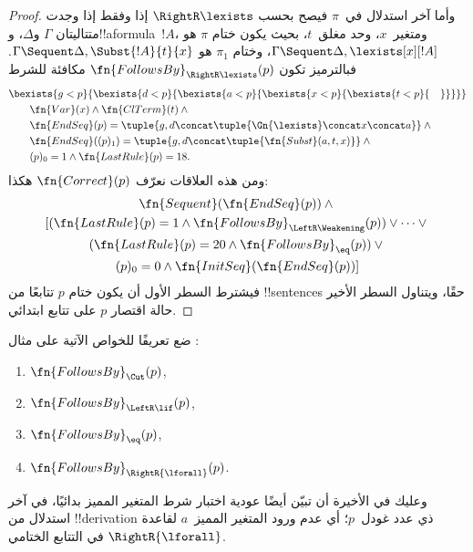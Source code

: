\documentclass[../../../include/open-logic-section]{subfiles}
\begin{document}
\begin{proof}
وأما آخر استدلال في~$\pi$ فيصح بحسب
$\RightR\lexists$ إذا وفقط إذا وجدت
متتاليتان $\Gamma$ و$\Delta$،
و!!a{formula}~$!A$، ومتغير~$x$،
وحد مغلق~$t$، بحيث يكون ختام $\pi$
هو $\Gamma \Sequent \Delta,\lexists[x][!A]$،
وختام $\pi_1$ هو
$\Gamma \Sequent \Delta,\Subst{!A}{t}{x}$.
فبالترميز تكون $\fn{FollowsBy}_{\RightR\lexists}(p)$
مكافئة للشرط
\begin{align*}
  & \bexists{g<p}{\bexists{d<p}{\bexists{a<p}{\bexists{x<p}{\bexists{t<p}{\quad}}}}}\\
  & \qquad \fn{Var}(x) \land \fn{ClTerm}(t) \land {}\\
  & \qquad \fn{EndSeq}(p) = 
  \tuple{
    g,
    d \concat \tuple{\Gn{\lexists} \concat x \concat a}
  } \land {}\\
  & \qquad \fn{EndSeq}((p)_1) = 
  \tuple{
    g,
    d \concat \tuple{\fn{Subst}(a, t, x)}
  } \land {}\\
  & \qquad (p)_0 = 1 \land \fn{LastRule}(p) = 18.
\end{align*}
ومن هذه العلاقات نعرّف $\fn{Correct}(p)$ هكذا:
\begin{multline*}
  \fn{Sequent}(\fn{EndSeq}(p)) \land {}\\ 
  [(\fn{LastRule}(p) = 1 \land 
  \fn{FollowsBy}_{\LeftR\Weakening}(p)) \lor \dots \lor {}\\
  (\fn{LastRule}(p) = 20 \land \fn{FollowsBy}_{\eq}(p)) \lor {}\\
  (p)_0 = 0 \land \fn{InitSeq}(\fn{EndSeq}(p))]
\end{multline*}
فيشترط السطر الأول أن يكون ختام $p$
تتابعًا من !!{sentence}s حقًا، ويتناول
السطر الأخير حالة اقتصار $p$ على تتابع ابتدائي.
\end{proof}

\begin{prob}
  ضع تعريفًا للخواص الآتية على مثال
  :
  \begin{enumerate}
  \item $\fn{FollowsBy}_{\Cut}(p)$,
  \item $\fn{FollowsBy}_{\LeftR\lif}(p)$,
  \item $\fn{FollowsBy}_{\eq}(p)$,
  \item $\fn{FollowsBy}_{\RightR{\lforall}}(p)$.
  \end{enumerate}
  وعليك في الأخيرة أن تبيّن أيضًا عودية اختبار
  شرط المتغير المميز بدائيًا، في آخر استدلال
  من !!{derivation} ذي عدد غودل~$p$؛ أي
  عدم ورود المتغير المميز~$a$ لقاعدة
  $\RightR{\lforall}$ في التتابع الختامي.
  \end{prob}
\end{document}
